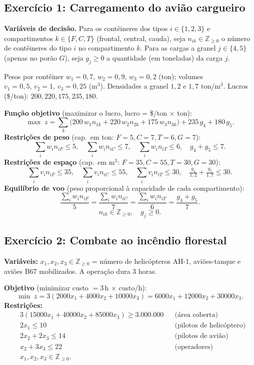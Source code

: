 \documentclass[11pt, a4paper]{article}
\newcommand{\Z}{\mathbb{Z}}
\begin{document}
\subsection{Exerc\'icio 1: Carregamento do avi\~ao cargueiro}
\textbf{Vari\'aveis de decis\~ao.} Para os cont\^eineres dos tipos $i\in\{1,2,3\}$
e compartimentos $k\in\{F,C,T\}$ (frontal, central, cauda), seja
$n_{ik}\in\Z_{\ge 0}$ o n\'umero de cont\^eineres do tipo $i$ no compartimento $k$.
Para as cargas a granel $j\in\{4,5\}$ (apenas no por\~ao $G$), seja
$g_j \ge 0$ a quantidade (em toneladas) da carga $j$.

\noindent Pesos por contêiner $w_1{=}0{,}7,\,w_2{=}0{,}9,\,w_3{=}0{,}2$ (ton);
volumes $v_1{=}0{,}5,\,v_2{=}1,\,v_3{=}0{,}25$ (m$^3$). Densidades a granel
$1{,}2$ e $1{,}7$ ton/m$^3$. Lucros (\$/ton): $200,220,175,235,180$.

\textbf{Fun\c{c}\~ao objetivo} (maximizar o lucro, lucro = \$/ton $\times$ ton):
\[
\max\; z = \sum_{k}\big(200\,w_1 n_{1k}+220\,w_2 n_{2k}+175\,w_3 n_{3k}\big)
            + 235\,g_4 + 180\,g_5 .
\]
\textbf{Restri\c{c}\~oes de peso} (cap.\ em ton: $F{=}5,C{=}7,T{=}6,G{=}7$):
\[
\sum_i w_i n_{iF}\le 5,\quad \sum_i w_i n_{iC}\le 7,\quad
\sum_i w_i n_{iT}\le 6,\quad g_4+g_5 \le 7 .
\]
\textbf{Restri\c{c}\~oes de espa\c{c}o} (cap.\ em m$^3$: $F{=}35,C{=}55,T{=}30,G{=}30$):
\[
\sum_i v_i n_{iF}\le 35,\quad \sum_i v_i n_{iC}\le 55,\quad
\sum_i v_i n_{iT}\le 30,\quad \tfrac{g_4}{1{,}2}+\tfrac{g_5}{1{,}7}\le 30 .
\]
\textbf{Equil\'ibrio de voo} (peso proporcional \`a capacidade de cada compartimento):
\[
\frac{\sum_i w_i n_{iF}}{5}=\frac{\sum_i w_i n_{iC}}{7}
=\frac{\sum_i w_i n_{iT}}{6}=\frac{g_4+g_5}{7}.
\]
\[ n_{ik}\in\Z_{\ge0},\quad g_j\ge 0. \]

\subsection{Exerc\'icio 2: Combate ao inc\^endio florestal}
\textbf{Vari\'aveis:} $x_1,x_2,x_3\in\Z_{\ge0}$ = n\'umero de helic\'opteros AH-1,
avi\~oes-tanque e avi\~oes B67 mobilizados. A opera\c{c}\~ao dura $3$ horas.

\textbf{Objetivo} (minimizar custo $=3\,$h $\times$ custo/h):
\[ \min\; z = 3(2000x_1+4000x_2+10000x_3)=6000x_1+12000x_2+30000x_3 .\]
\textbf{Restri\c{c}\~oes:}
\[
\begin{aligned}
&3(15000x_1+40000x_2+85000x_3) \ge 3{.}000{.}000 &&\text{(\'area coberta)}\\
&2x_1 \le 10 &&\text{(pilotos de helic\'optero)}\\
&2x_2+2x_3 \le 14 &&\text{(pilotos de avi\~ao)}\\
&x_2+3x_3 \le 22 &&\text{(operadores)}\\
&x_1,x_2,x_3 \in \Z_{\ge0}.
\end{aligned}
\]
\end{document}
